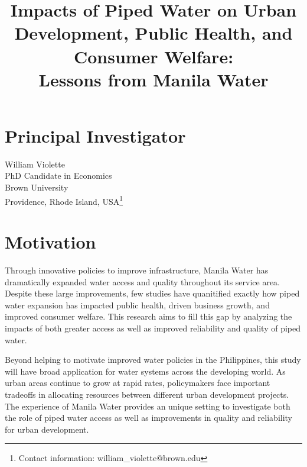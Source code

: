 \documentclass{article}
\title{\sc Impacts of Piped Water on Urban Development, Public Health, and Consumer Welfare: \\ Lessons from Manila Water}
\begin{document}
\maketitle

\large 



\section*{Principal Investigator}

William Violette \\
PhD Candidate in Economics \\
Brown University \\
Providence, Rhode Island, USA\footnote{Contact information: william\_violette@brown.edu}


\section*{Motivation}

Through innovative policies to improve infrastructure, Manila Water has dramatically expanded water access and quality throughout its service area.  Despite these large improvements, few studies have quanitified exactly how piped water expansion has impacted public health, driven business growth, and improved consumer welfare.  This research aims to fill this gap by analyzing the impacts of both greater access as well as improved reliability and quality of piped water.

Beyond helping to motivate improved water policies in the Philippines, this study will have broad application for water systems across the developing world.  As urban areas continue to grow at rapid rates, policymakers face important tradeoffs in allocating resources between different urban development projects.  The experience of Manila Water provides an unique setting to investigate both the role of piped water access as well as improvements in quality and reliability for urban development.
\end{document}
